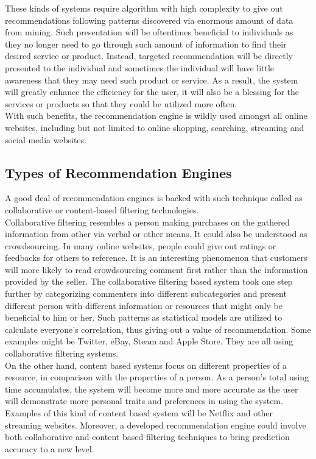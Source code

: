 \documentclass[sigconf]{acmart}
\begin{document}
These kinds of systems require algorithm with high complexity to give out recommendations following patterns discovered via enormous amount of data from mining. Such presentation will be oftentimes beneficial to individuals as they no longer need to go through such amount of information to find their desired service or product. Instead, targeted recommendation will be directly presented to the individual and sometimes the individual will have little awareness that they may need such product or service. As a result, the system will greatly enhance the efficiency for the user, it will also be a blessing for the services or products so that they could be utilized more often.\\
With such benefits, the recommendation engine is wildly used amongst all online websites, including but not limited to online shopping, searching, streaming and social media websites\cite{Shum2012}.
\subsection{Types of Recommendation Engines}
A good deal of recommendation engines is backed with such technique called as collaborative or content-based filtering technologies.\\ Collaborative filtering resembles a person making purchases on the gathered information from other via verbal or other means. It could also be understood as crowdsourcing\cite{Schrum2009}. In many online websites, people could give out ratings or feedbacks for others to reference. It is an interesting phenomenon that customers will more likely to read crowdsourcing comment first rather than the information provided by the seller. The collaborative filtering based system took one step further by categorizing commenters into different subcategories and present different person with different information or resources that might only be beneficial to him or her. Such patterns as statistical models are utilized to calculate everyone's correlation, thus giving out a value of recommendation. Some examples might be Twitter, eBay, Steam and Apple Store. They are all using collaborative filtering systems.\\
On the other hand, content based systems focus on different properties of a resource, in comparison with the properties of a person. As a person's total using time accumulates, the system will become more and more accurate as the user will demonstrate more personal traits and preferences in using the system. Examples of this kind of content based system will be Netflix and other streaming websites. Moreover, a developed recommendation engine could involve both collaborative and content based filtering techniques to bring prediction accuracy to a new level.
\end{document}

